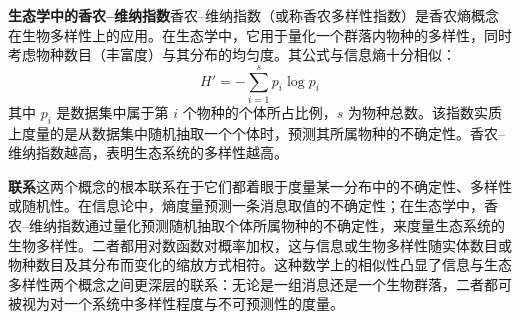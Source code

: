 \documentclass[11pt,a4paper]{ctexart}
\begin{document}
\noindent\textbf{生态学中的香农–维纳指数}\quad 香农–维纳指数（或称香农多样性指数）是香农熵概念在生物多样性上的应用。在生态学中，它用于量化一个群落内物种的多样性，同时考虑物种数目（丰富度）与其分布的均匀度。其公式与信息熵十分相似：
\[
H'=-\sum_{i=1}^{s}p_i\log p_i
\]
其中 $p_i$ 是数据集中属于第 $i$ 个物种的个体所占比例，$s$ 为物种总数。该指数实质上度量的是从数据集中随机抽取一个个体时，预测其所属物种的不确定性。香农–维纳指数越高，表明生态系统的多样性越高。

\noindent\textbf{联系}\quad 这两个概念的根本联系在于它们都着眼于度量某一分布中的不确定性、多样性或随机性。在信息论中，熵度量预测一条消息取值的不确定性；在生态学中，香农–维纳指数通过量化预测随机抽取个体所属物种的不确定性，来度量生态系统的生物多样性。二者都用对数函数对概率加权，这与信息或生物多样性随实体数目或物种数目及其分布而变化的缩放方式相符。这种数学上的相似性凸显了信息与生态多样性两个概念之间更深层的联系：无论是一组消息还是一个生物群落，二者都可被视为对一个系统中多样性程度与不可预测性的度量。
\end{document}
